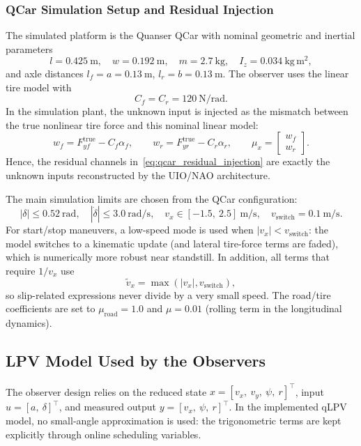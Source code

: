 \subsubsection{QCar Simulation Setup and Residual Injection}
The simulated platform is the Quanser QCar with nominal geometric and inertial parameters
\[
l=0.425~\mathrm{m},\quad w=0.192~\mathrm{m},\quad m=2.7~\mathrm{kg},\quad I_z=0.034~\mathrm{kg\,m^2},
\]
and axle distances $l_f=a=0.13~\mathrm{m}$, $l_r=b=0.13~\mathrm{m}$. The observer uses the linear tire model with
\[
C_f=C_r=120~\mathrm{N/rad}.
\]
In the simulation plant, the unknown input is injected as the mismatch between the true nonlinear tire force and this nominal linear model:
\begin{equation}\label{eq:qcar_residual_injection}
    w_f = F_{yf}^{\mathrm{true}} - C_f\alpha_f,\qquad
    w_r = F_{yr}^{\mathrm{true}} - C_r\alpha_r,\qquad
    \mu_x = \begin{bmatrix}w_f\\w_r\end{bmatrix}.
\end{equation}
Hence, the residual channels in~\eqref{eq:qcar_residual_injection} are exactly the unknown inputs reconstructed by the UIO/NAO architecture.

The main simulation limits are chosen from the QCar configuration:
\begin{equation*}
|\delta|\leq 0.52~\mathrm{rad},\quad |\dot{\delta}|\leq 3.0~\mathrm{rad/s},\quad
v_x\in[-1.5,\ 2.5]~\mathrm{m/s},\quad v_{\mathrm{switch}}=0.1~\mathrm{m/s}.
\end{equation*}
For start/stop maneuvers, a low-speed mode is used when $|v_x|<v_{\mathrm{switch}}$: the model switches to a kinematic update (and lateral tire-force terms are faded), which is numerically more robust near standstill. In addition, all terms that require $1/v_x$ use
\[
\tilde v_x=\max\!\left(|v_x|,v_{\mathrm{switch}}\right),
\]
so slip-related expressions never divide by a very small speed.
The road/tire coefficients are set to $\mu_{\mathrm{road}}=1.0$ and $\mu=0.01$ (rolling term in the longitudinal dynamics).

\subsection{LPV Model Used by the Observers}
The observer design relies on the reduced state $x=[v_x,\ v_y,\ \psi,\ r]^\top$, input $u=[a,\ \delta]^\top$, and measured output $y=[v_x,\ \psi,\ r]^\top$. In the implemented qLPV model, no small-angle approximation is used: the trigonometric terms are kept explicitly through online scheduling variables.

